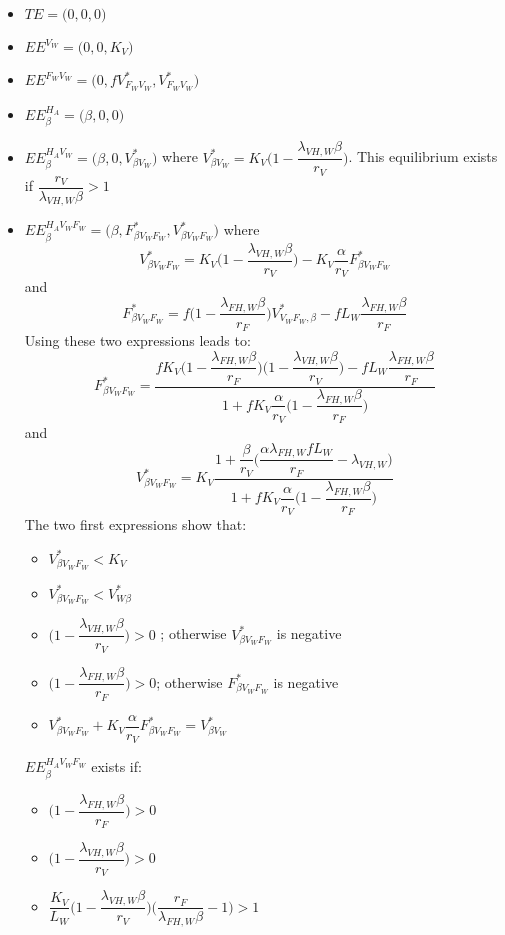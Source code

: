 \documentclass{article}
\newcommand{\lfw}{\lambda_{FH, W}}
\newcommand{\lvw}{\lambda_{VH, W}}
\begin{document}
\begin{itemize}
\item $TE = \Big(0,0,0 \Big)$
\item $EE^{V_W} = \Big(0,0 ,K_V \Big)$
\item $EE^{F_WV_W} = \Big(0, fV^*_{F_WV_W},V^*_{F_WV_W} \Big)$
\item $EE^{H_A}_\beta = \Big(\beta,0,0 \Big)$
\item $EE^{H_AV_W}_\beta = \Big(\beta,0,V_{\beta V_W}^* \Big)$ where $V_{\beta V_W}^* = K_V \Big(1 - \dfrac{\lvw \beta}{r_V} \Big)$. This equilibrium exists if $\dfrac{r_V}{\lvw \beta}>1$
\item $EE^{H_AV_WF_W}_\beta = \Big(\beta,F_{\beta V_WF_W}^*,V_{\beta V_WF_W}^* \Big)$ where
$$V_{\beta V_WF_W}^* = K_V \Big(1 -\dfrac{\lvw \beta}{r_V} \Big) - K_V \dfrac{\alpha}{r_V} F_{\beta V_WF_W}^* $$
and
$$
F_{\beta V_WF_W}^* = f \Big(1 - \dfrac{\lfw \beta}{r_F}\Big) V_{V_WF_W, \beta}^* - fL_W \dfrac{\lfw \beta}{r_F}
$$
Using these two expressions leads to:
$$F_{\beta V_WF_W}^* = \dfrac{fK_V\Big(1 - \dfrac{\lfw \beta}{r_F}\Big)\Big(1 - \dfrac{\lvw \beta}{r_V}\Big) - fL_W \dfrac{\lfw \beta}{r_F}}{1 + f K_V \dfrac{\alpha}{r_V} \Big(1 - \dfrac{\lfw \beta}{r_F}\Big)} $$
and
$$V_{\beta V_WF_W}^* = K_V \dfrac{1 + \dfrac{\beta}{r_V}\Big(\dfrac{\alpha \lfw f L_W}{r_F} - \lvw \Big)}{1 + fK_V\dfrac{\alpha}{r_V}\Big(1 - \dfrac{\lfw \beta}{r_F}\Big)}
$$
The two first expressions show that:
\begin{itemize}
\item $V_{\beta V_WF_W}^* < K_V$
\item $V_{\beta V_WF_W}^* < V_{W \beta}^*$
\item $\Big(1 -\dfrac{\lvw \beta}{r_V} \Big) > 0$ ; otherwise $V_{\beta V_WF_W}^*$ is negative
\item $\Big(1 - \dfrac{\lfw \beta}{r_F}\Big) > 0$; otherwise $F_{\beta V_WF_W}^*$ is negative
\item $V_{\beta V_WF_W}^* +K_V \dfrac{\alpha}{r_V} F_{\beta V_WF_W}^*  = V_{\beta V_W}^*$
\end{itemize}
$EE^{H_AV_WF_W}_\beta$ exists if:
\begin{itemize}
\item $\Big(1 - \dfrac{\lfw \beta}{r_F}\Big) > 0$
\item $\Big(1 -\dfrac{\lvw \beta}{r_V} \Big) > 0$ 
\item $\dfrac{K_V}{L_W}\Big(1 - \dfrac{\lvw \beta}{r_V}\Big) \Big(\dfrac{r_F}{\lfw \beta} - 1\Big) > 1$
\end{itemize}


\end{itemize}
\end{document}
